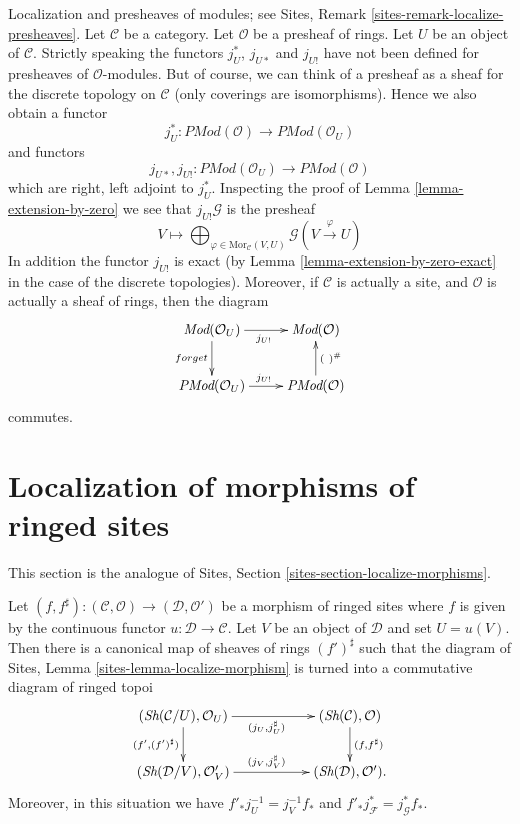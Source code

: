\begin{remark}
\label{remark-localize-presheaves}
Localization and presheaves of modules; see
Sites, Remark \ref{sites-remark-localize-presheaves}.
Let $\mathcal{C}$ be a category.
Let $\mathcal{O}$ be a presheaf of rings.
Let $U$ be an object of $\mathcal{C}$.
Strictly speaking the functors $j_U^*$, $j_{U*}$ and $j_{U!}$
have not been defined for presheaves of $\mathcal{O}$-modules.
But of course, we can think of a presheaf as a sheaf for the
discrete topology on $\mathcal{C}$ (only coverings are isomorphisms).
Hence we also obtain a functor
$$
j_U^* :
\textit{PMod}(\mathcal{O})
\longrightarrow
\textit{PMod}(\mathcal{O}_U)
$$
and functors
$$
j_{U*}, j_{U!} :
\textit{PMod}(\mathcal{O}_U)
\longrightarrow
\textit{PMod}(\mathcal{O})
$$
which are right, left adjoint to $j_U^*$. Inspecting the proof of
Lemma \ref{lemma-extension-by-zero} we see that $j_{U!}\mathcal{G}$
is the presheaf
$$
V \longmapsto
\bigoplus\nolimits_{\varphi \in \text{Mor}_{\mathcal{C}}(V, U)}
\mathcal{G}(V \xrightarrow{\varphi} U)
$$
In addition the functor $j_{U!}$ is exact (by
Lemma \ref{lemma-extension-by-zero-exact} in the
case of the discrete topologies). Moreover, if $\mathcal{C}$
is actually a site, and $\mathcal{O}$ is actually a sheaf of rings,
then the diagram
$$
\xymatrix{
\textit{Mod}(\mathcal{O}_U) \ar[r]_{j_{U!}} \ar[d]_{forget} &
\textit{Mod}(\mathcal{O}) \\
\textit{PMod}(\mathcal{O}_U) \ar[r]^{j_{U!}} &
\textit{PMod}(\mathcal{O}) \ar[u]_{(\ )^\#}
}
$$
commutes.
\end{remark}









\section{Localization of morphisms of ringed sites}
\label{section-localize-morphisms}

\noindent
This section is the analogue of
Sites, Section \ref{sites-section-localize-morphisms}.

\begin{lemma}
\label{lemma-localize-morphism-ringed-sites}
Let
$(f, f^\sharp) :
(\mathcal{C}, \mathcal{O})
\longrightarrow
(\mathcal{D}, \mathcal{O}')$
be a morphism of ringed sites where $f$ is given by the continuous
functor $u : \mathcal{D} \to \mathcal{C}$.
Let $V$ be an object of $\mathcal{D}$ and set $U = u(V)$.
Then there is a canonical map of sheaves of rings $(f')^\sharp$
such that the diagram of
Sites, Lemma \ref{sites-lemma-localize-morphism}
is turned into a commutative diagram of ringed topoi
$$
\xymatrix{
(\textit{Sh}(\mathcal{C}/U), \mathcal{O}_U)
\ar[rr]_{(j_U, j_U^\sharp)} \ar[d]_{(f', (f')^\sharp)} & &
(\textit{Sh}(\mathcal{C}), \mathcal{O})
\ar[d]^{(f, f^\sharp)} \\
(\textit{Sh}(\mathcal{D}/V), \mathcal{O}'_V)
\ar[rr]^{(j_V, j_V^\sharp)} & &
(\textit{Sh}(\mathcal{D}), \mathcal{O}').
}
$$
Moreover, in this situation we have $f'_*j_U^{-1} = j_V^{-1}f_*$
and $f'_*j_{\mathcal{F}}^* = j_{\mathcal{G}}^*f_*$.
\end{lemma}

